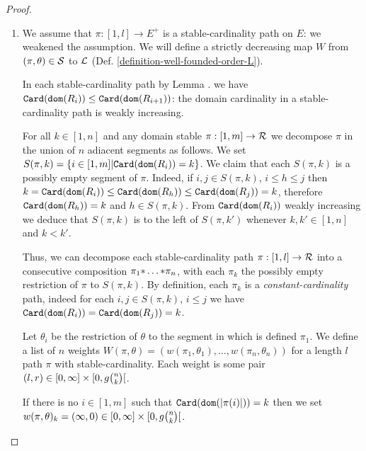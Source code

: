 \documentclass{lmcs}
\begin{document}
\begin{proof}
\begin{enumerate}
\item
We assume that $\pi:[1,l] \rightarrow E^+$ is a stable-cardinality
path on $E$: we weakened the  assumption.
 We will define a strictly decreasing map $W$ from
$(\pi,\theta) \in {\mathcal S}$ to ${\mathcal L}$ (Def. \ref{definition-well-founded-order-L}).

In each stable-cardinality path 
by Lemma 
\label{lemma-stable-cardinality-injective}.
\label{lemma-stable-cardinality-injective-01}
we have ${\tt Card}({\tt dom}(R_{i})) 
\le {\tt Card}({\tt dom}(R_{i+1}))$: the domain cardinality in a stable-cardinality path
is weakly increasing. 

For all $k \in [1,n]$ and any domain stable $ \pi :[1,m] \rightarrow {\mathcal R} $ 
we decompose $\pi$ in the union of $n$ adiacent segments as follows. We set
 $S(\pi,k) = \{i \in[1,m] | {\tt Card}({\tt dom}(R_i)) = k \}$. 
We claim that each $S(\pi,k)$ is a possibly empty segment of $\pi$. 
Indeed, if $i, j \in 
S(\pi,k)$, $i \le h \le j$ then $k = {\tt Card}({\tt dom}(R_i)) \le {\tt Card}({\tt dom}(R_h))
\le {\tt Card}({\tt dom}(R_j)) = k$, therefore ${\tt Card}({\tt dom}(R_h))=k$ and $h \in S(\pi,k)$.
From ${\tt Card}({\tt dom}(R_{i}))$ weakly increasing 
we deduce that $S(\pi,k)$ is to the left
of $S(\pi,k')$ whenever $k,k' \in [1,n]$ and $k < k'$.

Thus, we can decompose each stable-cardinality path 
$\pi:[1,l] \rightarrow {\mathcal R}$ into
a consecutive composition $\pi_1 {*} \ldots {*} \pi_n$, 
with each $\pi_k$ the possibly empty restriction of $\pi$ to $S(\pi,k)$.
By definition, each $\pi_k$ is a \emph{constant-cardinality} path,
indeed for each $i, j \in S(\pi,k)$, $i \le j$ we have 
${\tt Card}({\tt dom}(R_{i}))={\tt Card}({\tt dom}(R_{j}))=k$. 

Let $\theta_i$ be the restriction of $\theta$ to the segment in which is
defined $\pi_1$.
We define a list of $n$ weights $W(\pi,\theta) = (w(\pi_1, \theta_1),
\ldots, w(\pi_n, \theta_n))$ 
for a length $l$ path $\pi$ with stable-cardinality. Each weight
is some pair $(l,r) \in [0,\infty] \times [0,g\newton{n}{k}[$. 

If there is no $i \in[1,m]$ such that ${\tt Card}({\tt dom}({| \pi(i) |}))=k$
then we set $w(\pi,\theta)_k = (\infty,0)  
\in [0,\infty] \times [0,g\newton{n}{k}[$.


\end{enumerate}
\end{proof}
\end{document}
